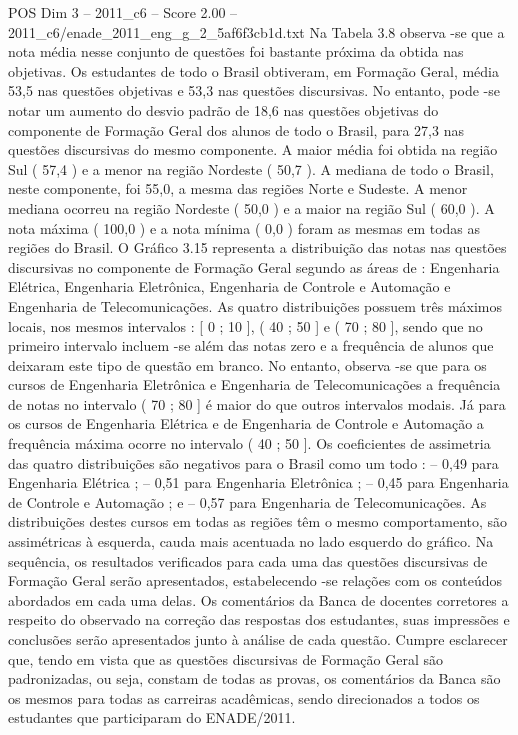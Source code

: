 \begin{textsample}{POS Dim 3 – 2011\_c6 – Score 2.00 – 2011\_c6/enade\_2011\_eng\_g\_2\_5af6f3cb1d.txt}
Na Tabela 3.8 observa -se que a nota média nesse conjunto de questões foi bastante próxima da obtida nas objetivas.
Os estudantes de todo o Brasil obtiveram, em Formação Geral, média 53,5 nas questões objetivas e 53,3 nas questões discursivas.
No entanto, pode -se notar um aumento do desvio padrão de 18,6 nas questões objetivas do componente de Formação Geral dos alunos de todo o Brasil, para 27,3 nas questões discursivas do mesmo componente.
A maior média foi obtida na região Sul ( 57,4 ) e a menor na região Nordeste ( 50,7 ).
A mediana de todo o Brasil, neste componente, foi 55,0, a mesma das regiões Norte e Sudeste.
A menor mediana ocorreu na região Nordeste ( 50,0 ) e a maior na região Sul ( 60,0 ).
A nota máxima ( 100,0 ) e a nota mínima ( 0,0 ) foram as mesmas em todas as regiões do Brasil.
O Gráfico 3.15 representa a distribuição das notas nas questões discursivas no componente de Formação Geral segundo as áreas de : Engenharia Elétrica, Engenharia Eletrônica, Engenharia de Controle e Automação e Engenharia de Telecomunicações.
As quatro distribuições possuem três máximos locais, nos mesmos intervalos : [ 0 ; 10 ], ( 40 ; 50 ] e ( 70 ; 80 ], sendo que no primeiro intervalo incluem -se além das notas zero e a frequência de alunos que deixaram este tipo de questão em branco.
No entanto, observa -se que para os cursos de Engenharia Eletrônica e Engenharia de Telecomunicações a frequência de notas no intervalo ( 70 ; 80 ] é maior do que outros intervalos modais.
Já para os cursos de Engenharia Elétrica e de Engenharia de Controle e Automação a frequência máxima ocorre no intervalo ( 40 ; 50 ].
Os coeficientes de assimetria das quatro distribuições são negativos para o Brasil como um todo : – 0,49 para Engenharia Elétrica ; – 0,51 para Engenharia Eletrônica ; – 0,45 para Engenharia de Controle e Automação ; e – 0,57 para Engenharia de Telecomunicações.
As distribuições destes cursos em todas as regiões têm o mesmo comportamento, são assimétricas à esquerda, cauda mais acentuada no lado esquerdo do gráfico.
Na sequência, os resultados verificados para cada uma das questões discursivas de Formação Geral serão apresentados, estabelecendo -se relações com os conteúdos abordados em cada uma delas.
Os comentários da Banca de docentes corretores a respeito do observado na correção das respostas dos estudantes, suas impressões e conclusões serão apresentados junto à análise de cada questão.
Cumpre esclarecer que, tendo em vista que as questões discursivas de Formação Geral são padronizadas, ou seja, constam de todas as provas, os comentários da Banca são os mesmos para todas as carreiras acadêmicas, sendo direcionados a todos os estudantes que participaram do ENADE/2011.

\end{textsample}
